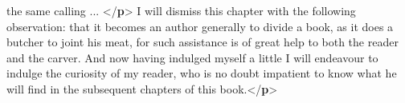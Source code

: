 \begin{shaded}
\hspace*{1em}\hspace*{1em}\hspace*{1em}\hspace*{1em} the same calling ... {</\textbf{p}>}\mbox{}\newline 
\hspace*{1em}I will dismiss this chapter with the following observation: that it\mbox{}\newline 
\hspace*{1em}\hspace*{1em}\hspace*{1em}\hspace*{1em} becomes an author generally to divide a book, as it does a butcher to\mbox{}\newline 
\hspace*{1em}\hspace*{1em}\hspace*{1em}\hspace*{1em} joint his meat, for such assistance is of great help to both the reader\mbox{}\newline 
\hspace*{1em}\hspace*{1em}\hspace*{1em}\hspace*{1em} and the carver. And now having indulged myself a little I will endeavour\mbox{}\newline 
\hspace*{1em}\hspace*{1em}\hspace*{1em}\hspace*{1em} to indulge the curiosity of my reader, who is no doubt impatient to know\mbox{}\newline 
\hspace*{1em}\hspace*{1em}\hspace*{1em}\hspace*{1em} what he will find in the subsequent chapters of this book.{</\textbf{p}>}\mbox{}\newline 
{}\mbox{}\newline 
{}\mbox{}\newline 

\end{shaded}
